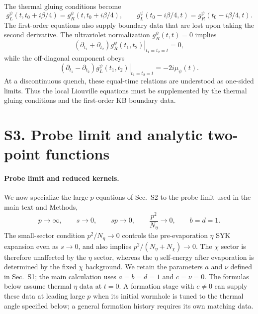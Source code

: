 \documentclass[11pt,a4paper]{article}
\begin{document}
The thermal gluing conditions become
\begin{equation}
g^\psi_L(t,t_0+i\beta/4)
=
g^\psi_R(t,t_0+i\beta/4),
\qquad
g^\psi_L(t_0-i\beta/4,t)
=
g^\psi_R(t_0-i\beta/4,t).
\label{eq:S-large-p-gluing}
\end{equation}
The first-order equations also supply boundary data that are lost upon taking
the second derivative. The ultraviolet normalization
\(g^\psi_R(t,t)=0\) implies
\begin{equation}
\left.
\left(
\partial_{t_1}
+
\partial_{t_2}
\right)
g^\psi_R(t_1,t_2)
\right|_{t_1=t_2=t}
=
0,
\label{eq:S-equal-time-R}
\end{equation}
while the off-diagonal component obeys
\begin{equation}
\left.
\left(
\partial_{t_1}
-
\partial_{t_2}
\right)
g^\psi_L(t_1,t_2)
\right|_{t_1=t_2=t}
=
-2i\mu_\psi(t).
\label{eq:S-equal-time-L}
\end{equation}
At a discontinuous quench, these equal-time relations are understood as
one-sided limits. Thus the local Liouville equations must be supplemented by
the thermal gluing conditions and the first-order KB boundary data.

\section*{S3. Probe limit and analytic two-point functions}

\paragraph*{Probe limit and reduced kernels.}

We now specialize the large-\(p\) equations of Sec.~S2 to the probe limit
used in the main text and Methods,
\begin{equation}
p\longrightarrow\infty,
\qquad
s\longrightarrow0,
\qquad
sp\longrightarrow0,
\qquad
\frac{p^2}{N_\eta}\longrightarrow0,
\qquad
b=d=1 .
\label{eq:S3-probe-limit}
\end{equation}
The small-sector condition \(p^2/N_\eta\to0\) controls the
pre-evaporation \(\eta\) SYK expansion even as \(s\to0\), and also
implies \(p^2/(N_\eta+N_\chi)\to0\). The \(\chi\) sector is
therefore unaffected by the \(\eta\) sector, whereas
the \(\eta\) self-energy after evaporation is determined by the fixed
\(\chi\) background. We retain the parameters \(a\) and \(\nu\) defined in
Sec.~S1; the main calculation uses
\(a=b=d=1\) and \(c=\nu=0\). The formulas below assume thermal \(\eta\) data at \(t=0\). A
formation stage with \(c\ne0\) can supply these data at leading large
\(p\) when its initial wormhole is tuned to the thermal angle specified
below; a general formation history requires its own matching data.
\end{document}
